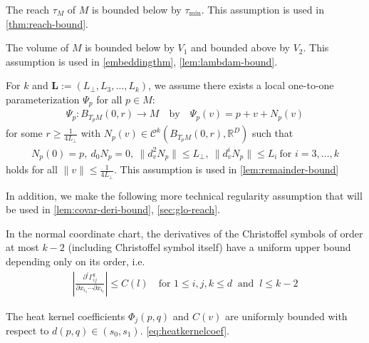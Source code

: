 \begin{assumption}[Reach]
	\label{as:reach}
  The reach $\tau_M$ of $M$ is bounded below by $\tau_{\min}$. This assumption is used in \cref{thm:reach-bound}.
\end{assumption}

\begin{assumption}[Volume]
	\label{ass:V}
  The volume of $M$ is bounded below by $V_1$ and bounded above by $V_2$. This assumption is used in \cref{embeddingthm}, \cref{lem:lambdam-bound}.
\end{assumption}

\begin{assumption}[Smoothness]
	\label{as:smooth}
For $k$ and $\textbf{L}:=\left(L_\perp,L_3,\dots,L_k\right)$, we assume there exists a local one-to-one parameterization $\Psi_p$ for all $p \in M$:
	\begin{align}
		\Psi_p :B_{T_pM}(0,r) \rightarrow M \quad \text{by} \quad \Psi_p(v)=p+v+N_p(v)
	\end{align}
	for some $r\geq \frac{1}{4L_\perp}$ with $N_p(v) \in \mathcal{C}^k(B_{T_pM}(0,r),\mathbb{R}^D)$ such that 
	\begin{align}
		N_p(0)=p,\  d_0N_p=0,\ \|d_v^2N_p\| \leq L_\perp, \ \|d_v^iN_p\|\leq L_i\ \text{for }i=3,\dots,k
	\end{align}
	holds for all $\|v\|\leq \frac{1}{4L_\perp}$. This assumption is used in \cref{lem:remainder-bound}
\end{assumption}


In addition, we make the following more technical regularity
assumption that will be used in \cref{lem:covar-deri-bound}, \cref{sec:glo-reach}.


\begin{assumption}
	\label{as:Christoffel}
	In the normal coordinate chart, the derivatives of the Christoffel symbols of order at most $k-2$ (including Christoffel symbol itself) have a uniform upper bound depending only on its order, i.e.
	\begin{align}
		|\frac{\partial^l \Gamma_{ij}^k}{\partial x_{i_1}\cdots\partial x_{i_l}}| \leq C(l) \quad \text{for } 1\leq i,j,k\leq d\ \text{ and }\  l\leq k-2
	\end{align}
\end{assumption}

\begin{assumption}
    \label{as:heatkernel}
    The heat kernel coefficients $\Phi_j(p,q)$ and $C(v)$ are uniformly bounded with respect to $d(p,q) \in (s_0, s_1)$. \cref{eq:heatkernelcoef}.
\end{assumption}


